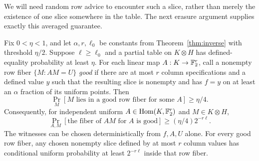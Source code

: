 We will need random row advice to encounter such a slice, rather than
merely the existence of one slice somewhere in the table.  The next
erasure argument supplies exactly this averaged guarantee.

\begin{lemma}
\label{lem:many-fibers}
Fix $0<\eta<1$, and let $\alpha,r,\ell_0$ be constants from
Theorem~\ref{thm:inverse} with threshold $\eta/2$.
Suppose $\ell\geq\ell_0$ and a partial table on $K\otimes H$ has
defined-equality probability at least $\eta$.  For each linear map
$A:K\to\mathbb F_2^r$, call a nonempty row fiber $\{M:AM=U\}$
\emph{good} if there are at most $r$ column specifications and a
defined value $y$ such that the resulting slice is nonempty and has
$f=y$ on at least an $\alpha$ fraction of its uniform points.
Then
\begin{equation}
 \Pr_M[\text{$M$ lies in a good row fiber for some $A$}]
 \geq\eta/4.
 \label{eq:prelim-good-union}
\end{equation}
Consequently, for independent uniform $A\in\operatorname{Hom}(K,\mathbb F_2^r)$ and
$M\in K\otimes H$,
\begin{equation}
 \Pr_{A,M}[\text{the fiber of $AM$ for $A$ is good}]
 \geq (\eta/4)2^{-r\ell}.
 \label{eq:prelim-many-fibers}
\end{equation}
The witnesses can be chosen deterministically from $f,A,U$ alone.
For every good row fiber, any chosen nonempty slice defined by at most
$r$ column values has conditional uniform probability at least
$2^{-r\ell}$ inside that row fiber.
\end{lemma}

